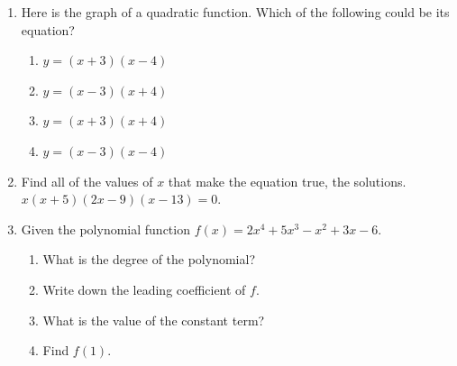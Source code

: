 \documentclass[12pt, twoside]{article}
\begin{document}
\begin{enumerate}
\item Here is the graph of a quadratic function. Which of the following could be its equation?
    \begin{center}
    \end{center}
    \begin{multicols}{2}
    \begin{enumerate}
        \item $y=(x+3)(x-4)$
        \item $y=(x-3)(x+4)$
        \item $y=(x+3)(x+4)$
        \item $y=(x-3)(x-4)$
    \end{enumerate}
    \end{multicols}

\item Find all of the values of $x$ that make the equation true, the solutions. \\[0.25cm]
$x(x+5)(2x-9)(x-13)=0$. 

\newpage
\item Given the polynomial function $f(x)=2x^4+5x^3-x^2+3x-6$. 
    \begin{enumerate}[itemsep=0.7cm]
        \item What is the degree of the polynomial?
        \item Write down the leading coefficient of $f$.
        \item What is the value of the constant term?
        \item Find $f(1)$.
    \end{enumerate} \vspace{0.7cm}


\end{enumerate}
\end{document}
